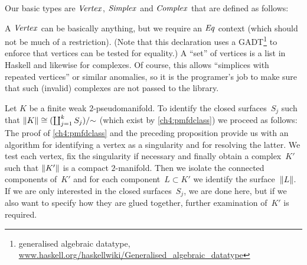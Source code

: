 Our basic types are \ensuremath{\Conid{Vertex}}, \ensuremath{\Conid{Simplex}} and \ensuremath{\Conid{Complex}} that are defined as
follows:
\resethooks
A \ensuremath{\Conid{Vertex}} can be basically anything, but we require an \ensuremath{\Conid{Eq}} context
(which should not be much of a restriction). (Note that this declaration
uses a GADT\footnote{generalised algebraic datatype,
\href{http://www.haskell.org/haskellwiki/Generalised_algebraic_datatype}{%
\url{www.haskell.org/haskellwiki/Generalised_algebraic_datatype}}}
to enforce that vertices can be tested for equality.) A \enquote{set}
of vertices is a list in Haskell and likewise for complexes. Of course,
this allows \enquote{simplices with repeated vertices} or similar anomalies,
so it is the programer's job to make sure that such (invalid) complexes
are not passed to the library.

Let $K$ be a finite weak $2$-pseudomanifold. To identify the closed
surfaces~$S_j$ such that $\lVert K\rVert \cong (\coprod_{j=1}^k S_j)/{\sim}$ 
(which exist by \cref{ch4:pmfdclass}) we proceed as follows:
The proof of \cref{ch4:pmfdclass} and the preceding proposition provide us with an
algorithm for identifying a vertex as a singularity and for resolving the
latter. We test each vertex, fix the singularity if necessary and finally
obtain a complex~$K'$ such that $\lVert K'\rVert$ is a compact $2$-manifold. Then
we isolate the connected components of~$K'$ and for each component~$L\subset K'$
we identify the surface~$\lVert L\rVert$. If we are only interested in the closed
surfaces~$S_j$, we are done here, but if we also want to specify how they
are glued together, further examination of~$K'$ is required.

